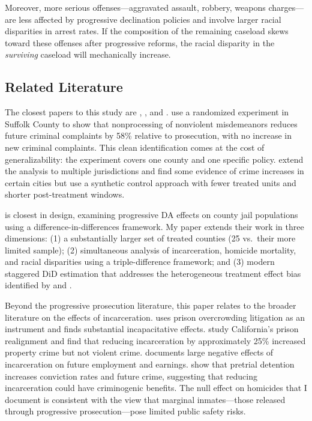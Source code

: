 \documentclass[12pt]{article}
\begin{document}
Moreover, more serious offenses---aggravated assault, robbery, weapons charges---are less affected by progressive declination policies and involve larger racial disparities in arrest rates. If the composition of the remaining caseload skews toward these offenses after progressive reforms, the racial disparity in the \textit{surviving} caseload will mechanically increase.

\subsection{Related Literature}

The closest papers to this study are \citet{agan2023misdemeanor}, \citet{agan2025progressive}, and \citet{petersen2024progressive}. \citet{agan2023misdemeanor} use a randomized experiment in Suffolk County to show that nonprocessing of nonviolent misdemeanors reduces future criminal complaints by 58\% relative to prosecution, with no increase in new criminal complaints. This clean identification comes at the cost of generalizability: the experiment covers one county and one specific policy. \citet{agan2025progressive} extend the analysis to multiple jurisdictions and find some evidence of crime increases in certain cities but use a synthetic control approach with fewer treated units and shorter post-treatment windows.

\citet{petersen2024progressive} is closest in design, examining progressive DA effects on county jail populations using a difference-in-differences framework. My paper extends their work in three dimensions: (1) a substantially larger set of treated counties (25 vs.\ their more limited sample); (2) simultaneous analysis of incarceration, homicide mortality, and racial disparities using a triple-difference framework; and (3) modern staggered DiD estimation that addresses the heterogeneous treatment effect bias identified by \citet{goodmanbacon2021did} and \citet{dechaisemartin2020two}.

Beyond the progressive prosecution literature, this paper relates to the broader literature on the effects of incarceration. \citet{levitt1996effect} uses prison overcrowding litigation as an instrument and finds substantial incapacitative effects. \citet{lofstrom2022incapacitation} study California's prison realignment and find that reducing incarceration by approximately 25\% increased property crime but not violent crime. \citet{mueller2016racial} documents large negative effects of incarceration on future employment and earnings. \citet{dobbie2018effects} show that pretrial detention increases conviction rates and future crime, suggesting that reducing incarceration could have criminogenic benefits. The null effect on homicides that I document is consistent with the view that marginal inmates---those released through progressive prosecution---pose limited public safety risks.
\end{document}
